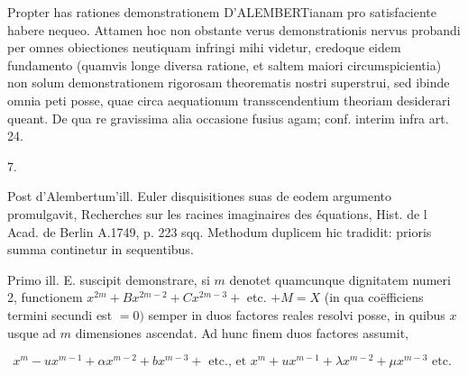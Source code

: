 \documentclass[10pt]{article}
\begin{document}
Propter has rationes demonstrationem D'ALEMBERTianam pro satisfaciente habere nequeo. Attamen hoc non obstante verus demonstrationis nervus probandi per omnes obiectiones neutiquam infringi mihi videtur, credoque eidem fundamento (quamvis longe diversa ratione, et saltem maiori circumspicientia) non solum demonstrationem rigorosam theorematis nostri superstrui, sed ibinde omnia peti posse, quae circa aequationum transscendentium theoriam desiderari queant. De qua re gravissima alia occasione fusius agam; conf. interim infra art. 24.

7.

Post d'Alembertum'ill. Euler disquisitiones suas de eodem argumento promulgavit, Recherches sur les racines imaginaires des équations, Hist. de l Acad. de Berlin A.1749, p. 223 sqq. Methodum duplicem hic tradidit: prioris summa continetur in sequentibus.

Primo ill. E. suscipit demonstrare, si \(m\) denotet quamcunque dignitatem numeri 2, functionem \(x^{2 m}+B x^{2 m-2}+C x^{2 m-3}+\) etc. \(+M=X\) (in qua coëfficiens termini secundi est \(=0)\) semper in duos factores reales resolvi posse, in quibus \(x\) usque ad \(m\) dimensiones ascendat. Ad hunc finem duos factores assumit,

\[
x^{m}-u x^{m-1}+\alpha x^{m-2}+b x^{m-3}+\text { etc., et } x^{m}+u x^{m-1}+\lambda x^{m-2}+\mu x^{m-3} \text { etc. }
\]
\end{document}
